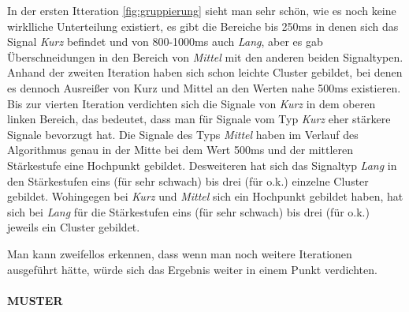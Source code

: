 In der ersten Itteration \autoref{fig:gruppierung} sieht man sehr schön, wie es noch keine wirklliche Unterteilung existiert, es gibt die Bereiche bis 250ms in denen sich das Signal \textit{Kurz} befindet und von 800-1000ms auch \textit{Lang}, aber es gab Überschneidungen in den Bereich von \textit{Mittel} mit den anderen beiden Signaltypen. 
Anhand der zweiten Iteration haben sich schon leichte Cluster gebildet, bei denen es dennoch Ausreißer von Kurz und Mittel an den Werten nahe 500ms existieren. 
Bis zur vierten Iteration verdichten sich die Signale von \textit{Kurz} in dem oberen linken Bereich, das bedeutet, dass man für Signale vom Typ \textit{Kurz} eher stärkere Signale bevorzugt hat. 
Die Signale des Typs \textit{Mittel} haben im Verlauf des Algorithmus genau in der Mitte bei dem Wert 500ms und der mittleren Stärkestufe eine Hochpunkt gebildet. 
Desweiteren hat sich das Signaltyp \textit{Lang} in den Stärkestufen eins (für sehr schwach) bis drei (für o.k.) einzelne Cluster gebildet. 
Wohingegen bei \textit{Kurz} und \textit{Mittel} sich ein Hochpunkt gebildet haben, hat sich bei \textit{Lang} für die Stärkestufen eins (für sehr schwach) bis drei (für o.k.) jeweils ein Cluster gebildet.

Man kann zweifellos erkennen, dass wenn man noch weitere Iterationen ausgeführt hätte, würde sich das Ergebnis weiter in einem Punkt verdichten. 



\paragraph{MUSTER}

